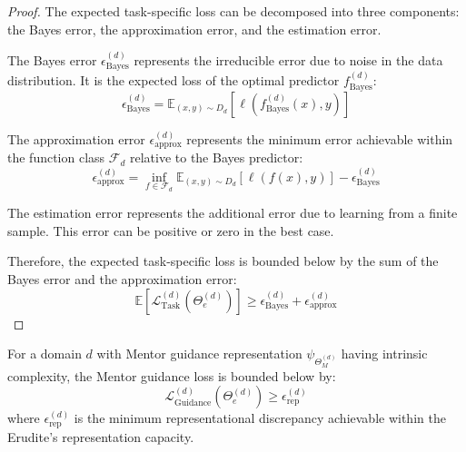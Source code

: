 \begin{proof}
The expected task-specific loss can be decomposed into three components: the Bayes error, the approximation error, and the estimation error.

The Bayes error $\epsilon_{\text{Bayes}}^{(d)}$ represents the irreducible error due to noise in the data distribution. It is the expected loss of the optimal predictor $f_{\text{Bayes}}^{(d)}$:
\begin{equation}
\epsilon_{\text{Bayes}}^{(d)} = \mathbb{E}_{(x,y) \sim D_d}[\ell(f_{\text{Bayes}}^{(d)}(x), y)]
\end{equation}

The approximation error $\epsilon_{\text{approx}}^{(d)}$ represents the minimum error achievable within the function class $\mathcal{F}_d$ relative to the Bayes predictor:
\begin{equation}
\epsilon_{\text{approx}}^{(d)} = \inf_{f \in \mathcal{F}_d} \mathbb{E}_{(x,y) \sim D_d}[\ell(f(x), y)] - \epsilon_{\text{Bayes}}^{(d)}
\end{equation}

The estimation error represents the additional error due to learning from a finite sample. This error can be positive or zero in the best case.

Therefore, the expected task-specific loss is bounded below by the sum of the Bayes error and the approximation error:
\begin{equation}
\mathbb{E}[\mathcal{L}_{\text{Task}}^{(d)}(\Theta_e^{(d)})] \geq \epsilon_{\text{Bayes}}^{(d)} + \epsilon_{\text{approx}}^{(d)}
\end{equation}
\end{proof}

\begin{theorem}
For a domain $d$ with Mentor guidance representation $\psi_{\Theta_M^{(d)}}$ having intrinsic complexity, the Mentor guidance loss is bounded below by:
\begin{equation}
\mathcal{L}_{\text{Guidance}}^{(d)}(\Theta_e^{(d)}) \geq \epsilon_{\text{rep}}^{(d)}
\end{equation}
where $\epsilon_{\text{rep}}^{(d)}$ is the minimum representational discrepancy achievable within the Erudite's representation capacity.
\end{theorem}

